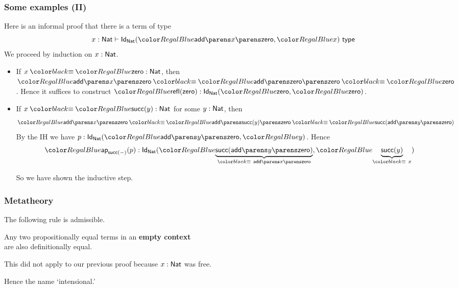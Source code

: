 \documentclass[handout]{beamer} %
\begin{document}
\begin{frame}
  \frametitle{Some examples (II)}
  
  Here is an informal proof that there is a term of type
  \[
    \IsTy[x : \Nat]{
      \Id{\Nat}{
        \App{\App{\textsf{add}}{x}}{\Zero}
      }{
        x
      }
    }[]
  \]
  We proceed by induction on $x : \Nat$.
  \begin{itemize}
    \item If $x \deq \Tm{\Zero} : \Nat$, then 
      $
      \Tm{\App{\App{\textsf{add}}{x}}{\Zero}}
        \deq
      \Tm{\App{\App{\textsf{add}}{\Zero}}{\Zero}}
        \deq 
      \Tm{\Zero}
      $.
      Hence it suffices to construct $\Tm{\Refl{\Zero}} : \Id{\Nat}{\Zero}{\Zero}$.
    \item If $x \deq \Tm{\Succ{y}} : \Nat$ for some $y : \Nat$, then
    \[
      \Tm{\App{\App{\textsf{add}}{x}}{\Zero}}
        \deq
      \Tm{\App{\App{\textsf{add}}{\Succ{y}}}{\Zero}}
        \deq
      \Tm{\Succ{\App{\App{\textsf{add}}{y}}{\Zero}}}
    \]
    By the IH we have $p : \Id{\Nat}{\App{\App{\textsf{add}}{y}}{\Zero}}{y}$.
    Hence 
    \[
    \Tm{\Ap{\Succ{-}}{p}} : \Id{\Nat}{
      \underbrace{\Succ{\App{\App{\textsf{add}}{y}}{\Zero}}}_{
        \deq\ \App{\App{\textsf{add}}{x}}{\Zero}
      }
    }{
      \underbrace{\Succ{y}}_{\deq\ x}
    }
    \]

    So we have shown the inductive step.
  \end{itemize}
    

\end{frame}


\begin{frame}
  \frametitle{Metatheory}

  \begin{theorem}
    The following rule is admissible.
    \begin{mathpar}
    \end{mathpar}
  \end{theorem}

  Any two propositionally equal terms in an \textbf{empty context}\\ are also definitionally equal.
  
  \medskip
  
  This did not apply to our previous proof because $x : \Nat$ was free.
  
  \medskip

  Hence the name `intensional.'
\end{frame}
\end{document}
